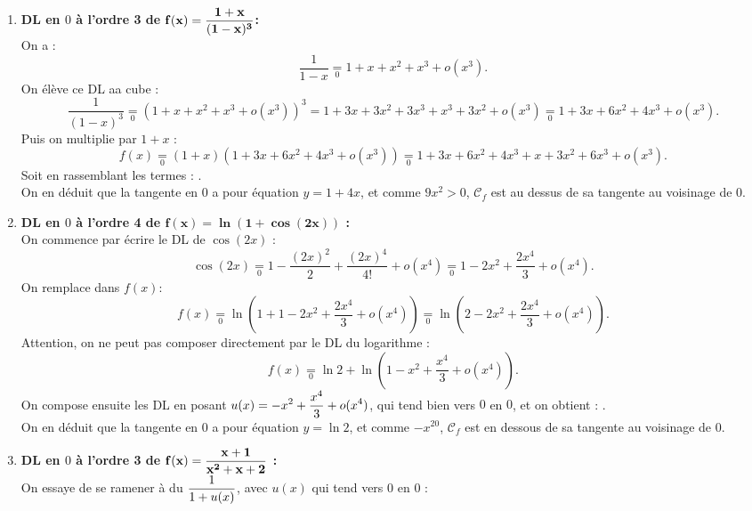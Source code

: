 \documentclass[a4paper, 11pt,reqno]{article}
\begin{document}
\begin{correction}
\begin{enumerate}
		      On en d\'eduit que la tangente en $0$ a pour \'equation $y=0$, et comme $-\ddp\frac{x^2}{6}<0$, $\mathcal{C}_f$ est en dessous de sa tangente au voisinage de $0$.
		\item \textbf{DL en $0$  \`a l'ordre 3 de $\mathbf{f(x)=\displaystyle\frac{1+x}{(1-x)^3}}$:}\\
		      On a :
		      $$\frac{1}{1-x} \underset{0}{=} 1+x+x^2+x^3+o(x^3).$$
		      On \'el\`eve ce DL aa cube :
		      $$\frac{1}{(1-x)^3} \underset{0}{=} \left( 1+x+x^2+x^3+o(x^3) \right)^3 = 1+3x+3x^2+3x^3 + x^3 + 3x^2 +o(x^3) \underset{0}{=} 1+3x+6x^2+4x^3 + o(x^3) .$$
		      Puis on multiplie par $1+x$ :
		      $$f(x) \underset{0}{=} (1+x) \left(1+3x+6x^2+4x^3 + o(x^3)\right)  \underset{0}{=} 1+3x+6x^2+4x^3 + x + 3x^2+6x^3 + o(x^3).$$
		      Soit en rassemblant les termes : .\\
		      On en d\'eduit que la tangente en $0$ a pour \'equation $y=1+4x$, et comme $9x^2>0$, $\mathcal{C}_f$ est au dessus de sa tangente au voisinage de $0$.
		\item \textbf{DL en $0$ \`a l'ordre 4 de $\mathbf{f(x)=\ln{(1+\cos{(2x)})}}$ :}\\
		      On commence par \'ecrire le DL de $\cos(2x)$ :
		      $$\cos(2x)\underset{0}{=} 1- \frac{(2x)^2}{2}+\frac{(2x)^4}{4!} + o(x^4) \underset{0}{=} 1-2x^2 + \frac{2x^4}{3} + o(x^4).$$
		      On remplace dans $f(x)$:
		      $$f(x) \underset{0}{=} \ln \left( 1 + 1-2x^2 + \frac{2x^4}{3} + o(x^4)\right)   \underset{0}{=} \ln \left(2-2x^2 + \frac{2x^4}{3} + o(x^4) \right).$$
		      Attention, on ne peut pas composer directement par le DL du logarithme :
		      $$f(x) \underset{0}{=} \ln 2 + \ln  \left(1-x^2 + \frac{x^4}{3} + o(x^4) \right) .$$
		      On compose ensuite les DL en posant $\displaystyle u(x) =-x^2 + \frac{x^4}{3} + o(x^4)$, qui tend bien vers $0$ en $0$, et on obtient :  .\\
		      On en d\'eduit que la tangente en $0$ a pour \'equation $y=\ln 2$, et comme $-x^20$, $\mathcal{C}_f$ est en dessous de sa tangente au voisinage de $0$.
		\item \textbf{DL en $0$ \`a l'ordre 3 de $\mathbf{f(x)=\displaystyle\frac{x+1}{x^2+x+2}}$ :}\\
		      On essaye de se ramener \`a du $\displaystyle \frac{1}{1+u(x)}$, avec $u(x)$ qui tend vers $0$ en $0$ :

\end{enumerate}
\end{correction}
\end{document}
